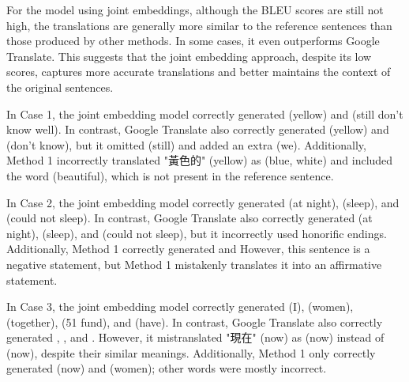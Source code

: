 \documentclass[PhD]{PHlab-thesis}
\begin{document}
For the model using joint embeddings, although the BLEU scores are still not high, the translations are generally more similar to the reference sentences than those produced by other methods. In some cases, it even outperforms Google Translate. This suggests that the joint embedding approach, despite its low scores, captures more accurate translations and better maintains the context of the original sentences.

In Case 1, the joint embedding model correctly generated  (yellow) and  (still don't know well). In contrast, Google Translate also correctly generated  (yellow) and  (don't know), but it omitted  (still) and added an extra  (we). Additionally, Method 1 incorrectly translated "黃色的" (yellow) as  (blue, white) and included the word  (beautiful), which is not present in the reference sentence.

In Case 2, the joint embedding model correctly generated  (at night),  (sleep), and  (could not sleep). In contrast, Google Translate also correctly generated  (at night),  (sleep), and  (could not sleep), but it incorrectly used honorific endings. Additionally, Method 1 correctly generated  and  However, this sentence is a negative statement, but Method 1 mistakenly translates it into an affirmative statement.

In Case 3, the joint embedding model correctly generated (I),  (women),  (together),  (51 fund), and  (have). In contrast, Google Translate also correctly generated , , and . However, it mistranslated "現在" (now) as  (now) instead of (now), despite their similar meanings. Additionally, Method 1 only correctly generated  (now) and  (women); other words were mostly incorrect.
\end{document}
